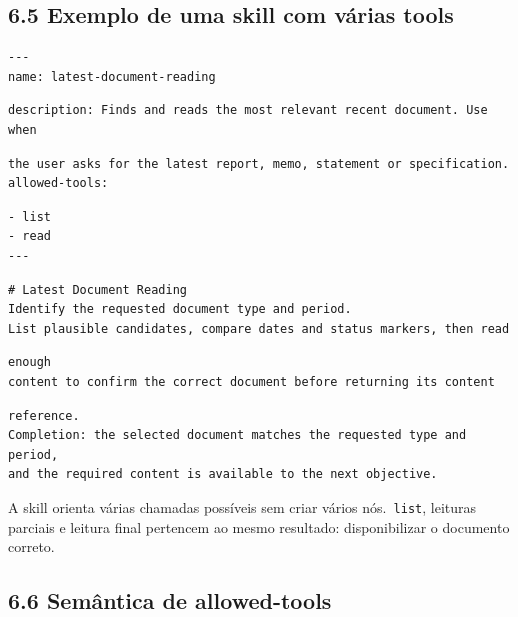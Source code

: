 \documentclass[12pt,a4paper]{article}
\begin{document}
\subsection*{6.5 Exemplo de uma skill com várias tools}

\begin{Verbatim}[breaklines=true,breakanywhere=true,fontsize=\small]
---
name: latest-document-reading
\end{Verbatim}


\begin{Verbatim}[breaklines=true,breakanywhere=true,fontsize=\small]
description: Finds and reads the most relevant recent document. Use when
\end{Verbatim}

\begin{Verbatim}[breaklines=true,breakanywhere=true,fontsize=\small]
the user asks for the latest report, memo, statement or specification.
allowed-tools:
\end{Verbatim}

\begin{Verbatim}[breaklines=true,breakanywhere=true,fontsize=\small]
- list
- read
---
\end{Verbatim}

\begin{Verbatim}[breaklines=true,breakanywhere=true,fontsize=\small]
# Latest Document Reading
Identify the requested document type and period.
List plausible candidates, compare dates and status markers, then read
\end{Verbatim}

\begin{Verbatim}[breaklines=true,breakanywhere=true,fontsize=\small]
enough
content to confirm the correct document before returning its content
\end{Verbatim}

\begin{Verbatim}[breaklines=true,breakanywhere=true,fontsize=\small]
reference.
Completion: the selected document matches the requested type and period,
and the required content is available to the next objective.
\end{Verbatim}

A skill orienta várias chamadas possíveis sem criar vários nós.\texttt{ list}, leituras parciais e leitura final pertencem ao mesmo resultado: disponibilizar o documento correto.


\subsection*{6.6 Semântica de allowed-tools}
\end{document}
